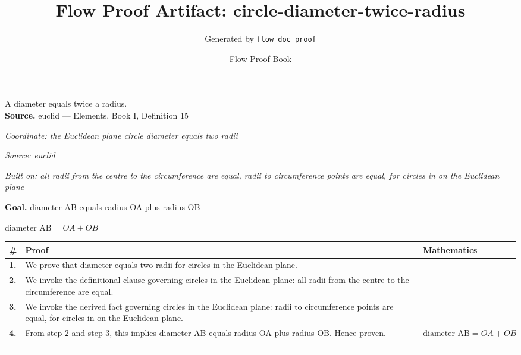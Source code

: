 \documentclass[11pt]{article}
\title{Flow Proof Artifact: circle-diameter-twice-radius}
\author{Generated by \texttt{flow doc proof}}
\date{Flow Proof Book}
\theoremstyle{definition}
\begin{document}
\maketitle
A diameter equals twice a radius.\\[0.5em]
\textbf{Source.} euclid — Elements, Book I, Definition 15\\[0.5em]
\bigskip
{}\par
\smallskip\noindent\textit{Coordinate: the Euclidean plane \cdot circle \cdot diameter equals two radii}\par
\smallskip\noindent\textit{Source: euclid}\par
\smallskip\noindent\textit{Built on: all radii from the centre to the circumference are equal, radii to circumference points are equal, for circles in on the Euclidean plane}\par
\medskip
\noindent\textbf{Goal.} diameter AB equals radius OA plus radius OB\par
\noindent$\displaystyle \text{diameter AB} = OA + OB$\par
\medskip
\noindent
\begin{tabular}{@{} >{\raggedright\arraybackslash}p{} >{\raggedright\arraybackslash}p{} >{\raggedleft\arraybackslash}p{} @{}}
\textbf{\#} & \textbf{Proof} & \textbf{Mathematics} \\
\midrule
\textbf{1.} & We prove that diameter equals two radii for circles in the Euclidean plane. & \\[0.45em]
\textbf{2.} & We invoke the definitional clause governing circles in the Euclidean plane: all radii from the centre to the circumference are equal. & \\[0.45em]
\textbf{3.} & We invoke the derived fact governing circles in the Euclidean plane: radii to circumference points are equal, for circles in on the Euclidean plane. & \\[0.45em]
\textbf{4.} & From step 2 and step 3, this implies diameter AB equals radius OA plus radius OB. Hence proven. & $\displaystyle \text{diameter AB} = OA + OB$ \\[0.45em]
\bottomrule
\end{tabular}
\label{thm:Geometry-circle-diameter_equals_two_radii}
\par\medskip\hrule
\end{document}
